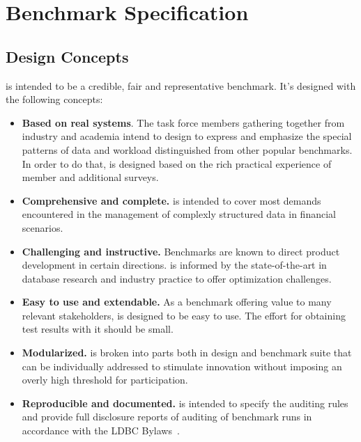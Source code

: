 \chapter{Benchmark Specification}
\label{sec:benchmark-specification}

\section{Design Concepts}

\ldbcfinbench is intended to be a credible, fair and representative benchmark.
It's designed with the following concepts:

\begin{itemize}
      \item \textbf{Based on real systems}. The task force members gathering
            together from industry and academia intend to design \ldbcfinbench
            to express and emphasize the special patterns of data and workload
            distinguished from other popular benchmarks. In order to do that,
            \ldbcfinbench is designed based on the rich practical experience of
            member and additional surveys.
      \item \textbf{Comprehensive and complete.} \ldbcfinbench is intended to
            cover most demands encountered in the management of complexly
            structured data in financial scenarios.
      \item \textbf{Challenging and instructive.} Benchmarks are known to direct
            product development in certain directions. \ldbcfinbench is informed
            by the state-of-the-art in database research and industry practice
            to offer optimization challenges.
      \item \textbf{Easy to use and extendable.} As a benchmark offering value
            to many relevant stakeholders, \ldbcfinbench is designed to be easy
            to use. The effort for obtaining test results with it should be
            small.
      \item \textbf{Modularized.} \ldbcfinbench is broken into parts both in
            design and benchmark suite that can be individually addressed to
            stimulate innovation without imposing an overly high threshold for
            participation.
      \item \textbf{Reproducible and documented.} \ldbcfinbench is intended to
            specify the auditing rules and provide full disclosure reports of
            auditing of benchmark runs in accordance with the LDBC
            Bylaws~\cite{ldbc_byelaws}.
\end{itemize}

